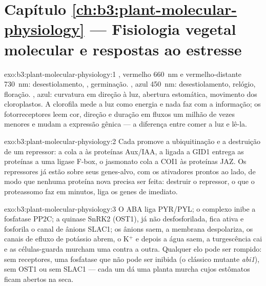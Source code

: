 \section*{Capítulo \ref{ch:b3:plant-molecular-physiology} --- Fisiologia vegetal molecular e respostas ao estresse}

\begin{solution}{exo:b3:plant-molecular-physiology:1}
, vermelho \qty{660}{nm} e vermelho-distante \qty{730}{nm}:
desestiolamento, , germinação. , azul
\qty{450}{nm}: desestiolamento, relógio, floração. , azul:
curvatura em direção à luz, abertura estomática, movimento dos
cloroplastos. A clorofila mede a luz como energia e nada faz com a
informação; os fotorreceptores leem cor, direção e duração em fluxos um
milhão de vezes menores e mudam a expressão gênica --- a diferença entre
comer a luz e lê-la.
\end{solution}

\begin{solution}{exo:b3:plant-molecular-physiology:2}
Cada  promove a ubiquitinação e a destruição de um repressor: a
 cola a  às proteínas Aux/IAA, a  ligada a GID1
entrega as proteínas  a uma ligase F-box, o jasmonato cola a COI1
às proteínas JAZ. Os repressores já estão sobre seus genes-alvo, com os
ativadores prontos ao lado, de modo que nenhuma proteína nova precisa ser
feita: destruir o repressor, o que o proteassomo faz em minutos, liga os
genes de imediato.
\end{solution}

\begin{solution}{exo:b3:plant-molecular-physiology:3}
O ABA liga PYR/PYL; o complexo inibe a fosfatase PP2C; a quinase SnRK2
(OST1), já não desfosforilada, fica ativa e fosforila o canal de ânions
SLAC1; os ânions saem, a membrana despolariza, os canais de efluxo de
potássio abrem, o K$^{+}$ e depois a água saem, a turgescência cai e as
células-guarda murcham uma contra a outra. Qualquer elo pode ser rompido:
sem receptores, uma fosfatase que não pode ser inibida (o clássico
mutante \emph{abi1}), sem OST1 ou sem SLAC1 --- cada um dá uma planta
murcha cujos estômatos ficam abertos na seca.
\end{solution}

